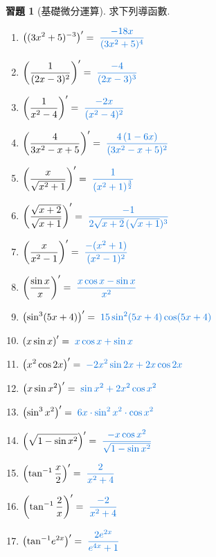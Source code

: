 \documentclass[12pt]{extarticle}
\newcommand{\ds}{\displaystyle}
\theoremstyle{definition}
\newtheorem*{exe}{習題}
\begin{document}
\begin{exe}[基礎微分運算] 求下列導函數.  
  \vspace{-2mm}
  \setlength{\columnsep}{5mm}
  \begin{multicols}{2}
    \begin{enumerate}\setlength{\itemsep}{0pt}
      \item $\ds \left((3x^2 + 5)^{-3}\right)' = {\color{C2}\;\frac{-18x}{(3x^2 + 5)^4}}$
      \item $\ds \left(\frac{1}{(2x - 3)^2}\right)' = {\color{C2}\;\frac{-4}{(2x - 3)^3}}$
      \item $\ds \left(\frac{1}{x^2 - 4}\right)' = {\color{C2}\;\frac{-2x}{(x^2 - 4)^2}}$
      \item $\ds \left(\frac{4}{3x^2 - x + 5}\right)' = {\color{C2}\;\frac{4\,(1 - 6x)}{(3x^2 - x + 5)^2}}$
      \item $\ds \left(\frac{x}{\sqrt{x^2 + 1}}\right)' = {\color{C2}\;\frac{1}{(x^2 + 1)^{\frac{3}{2}}}}$
      \item $\ds \left(\frac{\sqrt{x + 2}}{\sqrt{x + 1}}\right)' = {\color{C2}\;\frac{-1}{2\sqrt{x + 2}\,(\sqrt{x + 1})^3}}$
      \item $\ds \left(\frac{x}{x^2 - 1}\right)' = {\color{C2}\;\frac{-(x^2 + 1)}{(x^2 - 1)^2}}$
      \item $\ds \left(\frac{\sin x}{x}\right)' = {\color{C2}\;\frac{x\cos x - \sin x}{x^2}}$
      \item $\ds \left(\sin^3(5 x + 4)\right)' = {\color{C2}\;15\sin^2(5 x + 4)\cos(5 x + 4)}$
      \item $\ds \left(x\sin x\right)' = {\color{C2}\;x\cos x + \sin x}$
      \item $\ds \left(x^2\cos 2x\right)' = {\color{C2}\;-2x^2\sin 2x + 2x\cos 2x}$
      \item $\ds \left(x\sin x^2\right)' = {\color{C2}\;\sin x^2 + 2x^2\cos x^2}$
      \item $\ds \left(\sin^3 x^2\right)' = {\color{C2}\;6x\cdot\sin^2 x^2\cdot\cos x^2}$
      \item $\ds \left(\sqrt{1 - \sin x^2}\right)' = {\color{C2}\;\frac{-x\cos x^2}{\sqrt{1 - \sin x^2}}}$
      \item $\ds \left(\tan^{-1}{\frac{x}{2}}\right)' = {\color{C2}\;\frac{2}{x^2 + 4}}$
      \item $\ds \left(\tan^{-1}{\frac{2}{x}}\right)' = {\color{C2}\;\frac{-2}{x^2 + 4}}$
      \item $\ds \left(\tan^{-1}\!{e^{2x}}\right)' = {\color{C2}\;\frac{2e^{2x}}{e^{4x} + 1}}$

\end{enumerate}
\end{multicols}
\end{exe}
\end{document}
